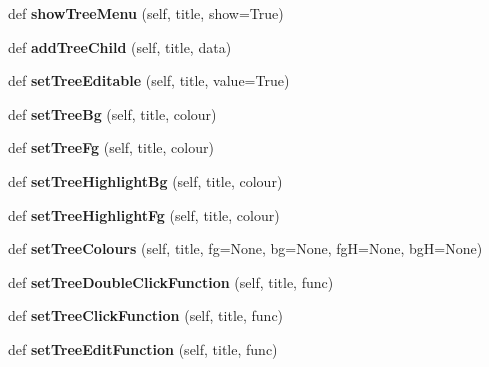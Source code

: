 \begin{DoxyCompactItemize}
def {\bfseries show\+Tree\+Menu} (self, title, show=True)
\item 
\mbox{\label{classappjar_1_1gui_ac288d51cee485e036922872952a59903}} 
def {\bfseries add\+Tree\+Child} (self, title, data)
\item 
\mbox{\label{classappjar_1_1gui_aec8022f65cdc29272488b0841342b83e}} 
def {\bfseries set\+Tree\+Editable} (self, title, value=True)
\item 
\mbox{\label{classappjar_1_1gui_a8cc49ad59af05f77aad7b9a0211baf03}} 
def {\bfseries set\+Tree\+Bg} (self, title, colour)
\item 
\mbox{\label{classappjar_1_1gui_a90bb5efe47decccb907b033e11114484}} 
def {\bfseries set\+Tree\+Fg} (self, title, colour)
\item 
\mbox{\label{classappjar_1_1gui_a4355a9b07fe006953d465cdd0a8bece0}} 
def {\bfseries set\+Tree\+Highlight\+Bg} (self, title, colour)
\item 
\mbox{\label{classappjar_1_1gui_a85b49f317fd4b2a45615973f8c551dc9}} 
def {\bfseries set\+Tree\+Highlight\+Fg} (self, title, colour)
\item 
\mbox{\label{classappjar_1_1gui_a685a14e15269e7be40efa7f562ee3a2f}} 
def {\bfseries set\+Tree\+Colours} (self, title, fg=None, bg=None, fgH=None, bgH=None)
\item 
\mbox{\label{classappjar_1_1gui_a8592e34a8ab6f9cca58abacc6d6dc2fb}} 
def {\bfseries set\+Tree\+Double\+Click\+Function} (self, title, func)
\item 
\mbox{\label{classappjar_1_1gui_a5e9f8eb81e07ae4de099052d01efef0e}} 
def {\bfseries set\+Tree\+Click\+Function} (self, title, func)
\item 
\mbox{\label{classappjar_1_1gui_a0ee986a3b128b249773c2475194f0716}} 
def {\bfseries set\+Tree\+Edit\+Function} (self, title, func)
\item 
\mbox{\label{classappjar_1_1gui_a11054848fa66c599268433e1793068b5}} 

\end{DoxyCompactItemize}
